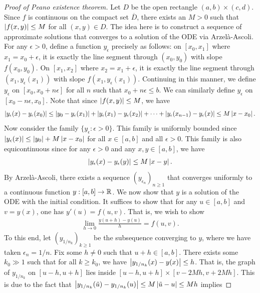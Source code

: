 \begin{proof}[Proof of Peano existence theorem]
    Let $D$ be the open rectangle $(a,b) \times (c,d)$. Since $f$ is continuous on the compact set $\overline{D}$, there exists an $M > 0$ such that $\left| f(x,y) \right| \leq M$ for all $(x,y) \in D$. The idea here is to construct a sequence of approximate solutions that converges to a solution of the ODE via Arzelà-Ascoli. For any $\epsilon > 0$, define a function $y_{\epsilon}$ precisely as follows: on $[x_{0},x_{1}]$ where $x_{1} = x_{0} + \epsilon$, it is exactly the line segment through $(x_{0},y_{0})$ with slope $f(x_{0},y_{0})$. On $[x_{1},x_{2}]$ where $x_{2} = x_{1} + \epsilon$, it is exactly the line segment through $(x_{1},y_{\epsilon}(x_{1}))$ with slope $f(x_{1},y_{\epsilon}(x_{1}))$. Continuing in this manner, we define $y_{\epsilon}$ on $[x_{0}, x_{0} + n \epsilon]$ for all $n$ such that $x_{0} + n \epsilon \leq b$. We can similarly define $y_{\epsilon}$ on $[x_{0}-n\epsilon,x_{0}]$. Note that since $\left| f(x,y) \right| \leq M$, we have
    \begin{align}
        \left| y_{\epsilon}(x) - y_{\epsilon}(x_{0}) \right| \leq \left| y_{0} - y_{\epsilon}(x_{1}) \right| + \left| y_{\epsilon}(x_{1}) - y_{\epsilon}(x_{2}) \right| + \cdots + \left| y_{\epsilon}(x_{n-1}) - y_{\epsilon}(x) \right| \leq M \left| x - x_{0} \right|.
    \end{align}
    Now consider the family $\{y_{\epsilon} : \epsilon > 0\}$. This family is uniformly bounded since $\left| y_{\epsilon}(x) \right| \leq \left| y_{0} \right| + M \left| x - x_{0} \right|$ for all $x \in [a,b]$ and all $\epsilon > 0$. This family is also equicontinuous since for any $\epsilon > 0$ and any $x,y \in [a,b]$, we have
    \begin{align}
        \left| y_{\epsilon}(x) - y_{\epsilon}(y) \right| \leq M \left| x - y \right|.
    \end{align}
    By Arzelà-Ascoli, there exists a sequence $(y_{\epsilon_{n}})_{n \geq 1}$ that converges uniformly to a continuous function $y:[a,b] \to \mathbb{R}$. We now show that $y$ is a solution of the ODE with the initial condition. It suffices to show that for any $u \in [a,b]$ and $v = y(x)$, one has $y'(u) = f(u,v)$. That is, we wish to show
    \begin{align}
        \lim_{h \to 0} \frac{y(u+h) - y(u)}{h} = f(u,v).
    \end{align}
    To this end, let $(y_{1/n_{k}})_{k \geq 1}$ be the subsequence converging to $y$, where we have taken $\epsilon_{n} = 1/n$. Fix some $h \neq 0$ such that $u + h \in [a,b]$. There exists some $k_{0} \gg 1$ such that for all $k \geq k_{0}$, we have $\left| y_{1/n_{k}}(x) - y(x) \right| \leq h$. That is, the graph of $y_{1/n_{k}}$ on $[u-h,u+h]$ lies inside $[u-h,u+h] \times [v-2Mh, v+2Mh]$. This is due to the fact that $\left| y_{1/n_{k}}(\tilde{u}) - y_{1/n_{k}}(u) \right| \leq M \left| \tilde{u} - u \right| \leq Mh$ implies

\end{proof}
